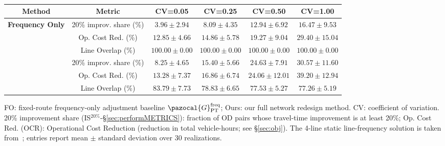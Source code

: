 \documentclass[a4paper,fleqn]{cas-sc}
\begin{document}
\begin{table}[pos=htbp]
\centering
\small
\setlength{\tabcolsep}{0pt}
\renewcommand{\arraystretch}{1.12}

\begin{threeparttable}
\begin{tabular*}{\textwidth}{@{\extracolsep{\fill}}cccccc@{}}
\toprule
\textbf{Method} & \textbf{Metric}
& \textbf{CV=0.05}
& \textbf{CV=0.25}
& \textbf{CV=0.50}
& \textbf{CV=1.00} \\
\midrule

\multirow{3}{*}{\textbf{Frequency Only}}
& 20\% improv. share (\%)
& $3.96\pm2.94$ & $8.09\pm4.35$
& $12.94\pm6.92$ & $16.47\pm9.53$ \\
& Op. Cost Red. (\%)
& $12.85\pm4.66$ & $14.86\pm5.78$
& $19.27\pm9.04$ & $29.40\pm15.04$ \\
& Line Overlap (\%)
& $100.00\pm0.00$ & $100.00\pm0.00$
& $100.00\pm0.00$ & $100.00\pm0.00$ \\
\addlinespace[0.25em]
\midrule

\multirow{3}{*}{\textbf{Ours}}
& 20\% improv. share (\%)
& $8.25\pm4.65$ & $15.40\pm5.66$
& $24.63\pm7.91$ & $30.57\pm11.60$ \\
& Op. Cost Red. (\%)
& $13.28\pm7.37$ & $16.86\pm6.74$
& $24.06\pm12.01$ & $39.20\pm12.94$ \\
& Line Overlap (\%)
& $83.79\pm7.73$ & $78.83\pm6.65$
& $77.53\pm5.27$ & $77.26\pm5.19$ \\

\bottomrule
\end{tabular*}

\begin{tablenotes}
\footnotesize
\item FO: fixed-route frequency-only adjustment baseline $\pazocal{G}_{\text{PT}}^{\text{freq}}$; Ours: our full network redesign method.
CV: coefficient of variation.
20\% improvement share (IS$^{20\%}$-\S{}\ref{sec:performMETRICS}): fraction of OD pairs whose travel-time improvement is at least 20\%;
Op. Cost Red. (OCR): Operational Cost Reduction (reduction in total vehicle-hours; see \S\ref{sec:obj}).
The 4-line static line-frequency solution is taken from~\citet{ahern2022approximate}; entries report mean $\pm$ standard deviation over 30 realizations.
\end{tablenotes}

\end{threeparttable}
\caption{}
\label{tab:frequencyBaselineCV}
\end{table}
\end{document}
